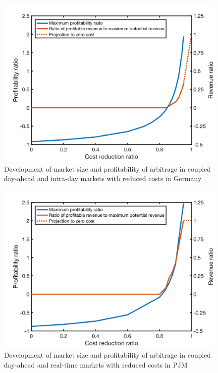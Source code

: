 \begin{figure}[h!]
	\centering
	\includegraphics[width=0.9\linewidth]{Figures/CostReduction_Germany_ESS}
	\caption{Development of market size and profitability of arbitrage in coupled day-ahead and intra-day markets with reduced costs in Germany}
	\label{fig:germany-ess-costreduction}
\end{figure}

\begin{figure}[h!]
	\centering
	\includegraphics[width=0.9\linewidth]{Figures/CostReduction_PJM_ESS}
	\caption{Development of market size and profitability of arbitrage in coupled day-ahead and real-time markets with reduced costs in PJM}
	\label{fig:pjm-ess-costreduction}
\end{figure}

